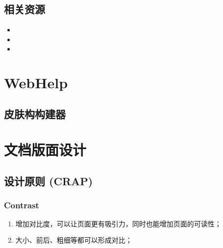 \documentclass[letterpaper,10pt,english]{sphinxmanual}
\begin{document}
\section{相关资源}
\label{\detokenize{formatting/dita_plugin-dev:id5}}\begin{itemize}
\item {} 
\sphinxAtStartPar
{}

\item {} 
\sphinxAtStartPar
{}

\item {} 
\sphinxAtStartPar
{}

\end{itemize}

\sphinxstepscope


\chapter{WebHelp}
\label{\detokenize{formatting/webhelp:webhelp}}\label{\detokenize{formatting/webhelp::doc}}

\section{皮肤构构建器}
\label{\detokenize{formatting/webhelp:id1}}
\sphinxAtStartPar
{}

\sphinxstepscope


\chapter{文档版面设计}
\label{\detokenize{formatting/layout-design:id1}}\label{\detokenize{formatting/layout-design::doc}}

\section{设计原则 (CRAP)}
\label{\detokenize{formatting/layout-design:crap}}

\subsection{Contrast}
\label{\detokenize{formatting/layout-design:contrast}}\begin{enumerate}
%
\item {} 
\sphinxAtStartPar
增加对比度，可以让页面更有吸引力，同时也能增加页面的可读性；

\item {} 
\sphinxAtStartPar
大小、前后、粗细等都可以形成对比；

\end{enumerate}
\end{document}
